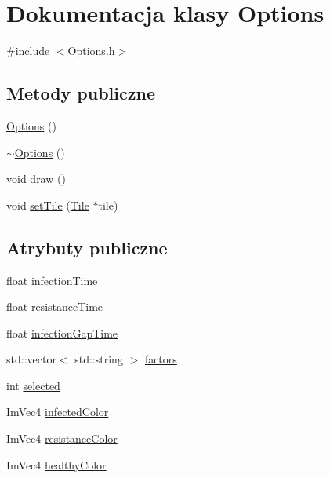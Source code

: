 \hypertarget{class_options}{}\section{Dokumentacja klasy Options}
\label{class_options}


{\ttfamily \#include $<$Options.\+h$>$}

\subsection*{Metody publiczne}
\begin{DoxyCompactItemize}
\item 
\mbox{\hyperlink{class_options_ab72fb640172a6109e34c8a5366563753}{Options}} ()
\item 
\mbox{\hyperlink{class_options_a86ddb85b183f8b58af5481f30a42fa92}{$\sim$\+Options}} ()
\item 
void \mbox{\hyperlink{class_options_aba27e24489aab55dc9d1d3c436709a73}{draw}} ()
\item 
void \mbox{\hyperlink{class_options_a7304b6cb34a2f1bbc5aac543778f1de9}{set\+Tile}} (\mbox{\hyperlink{class_tile}{Tile}} $\ast$tile)
\end{DoxyCompactItemize}
\subsection*{Atrybuty publiczne}
\begin{DoxyCompactItemize}
\item 
float \mbox{\hyperlink{class_options_aef217faac2fc40d51e584cbc11c738d5}{infection\+Time}}
\item 
float \mbox{\hyperlink{class_options_abbe6566b3ae55392365a1a89ece5ff72}{resistance\+Time}}
\item 
float \mbox{\hyperlink{class_options_ad8957194973c1d0c3c861b187cde47b9}{infection\+Gap\+Time}}
\item 
std\+::vector$<$ std\+::string $>$ \mbox{\hyperlink{class_options_acb384a30233b26ed44cc4dd4fc677b8e}{factors}}
\item 
int \mbox{\hyperlink{class_options_af0f36450ab33c6ab5e89113eebdb270b}{selected}}
\item 
Im\+Vec4 \mbox{\hyperlink{class_options_aa727b64a88f3b6dac54e70b675e303da}{infected\+Color}}
\item 
Im\+Vec4 \mbox{\hyperlink{class_options_a1dcf306ee25499d706f16aa120f2b2d2}{resistance\+Color}}
\item 
Im\+Vec4 \mbox{\hyperlink{class_options_a2da8226b9f582ed5e1870857f045151f}{healthy\+Color}}
\end{DoxyCompactItemize}
